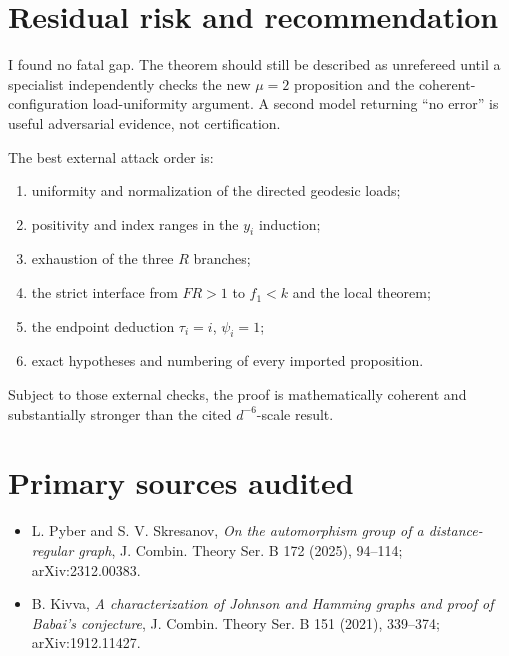 \documentclass[11pt]{article}
\begin{document}
\section{Residual risk and recommendation}
I found no fatal gap.  The theorem should still be described as unrefereed until a specialist independently checks the new $\mu=2$ proposition and the coherent-configuration load-uniformity argument.  A second model returning ``no error'' is useful adversarial evidence, not certification.

The best external attack order is:
\begin{enumerate}[leftmargin=2em,itemsep=0.25em]
\item uniformity and normalization of the directed geodesic loads;
\item positivity and index ranges in the $y_i$ induction;
\item exhaustion of the three $R$ branches;
\item the strict interface from $FR>1$ to $f_1<k$ and the local theorem;
\item the endpoint deduction $\tau_i=i$, $\psi_i=1$;
\item exact hypotheses and numbering of every imported proposition.
\end{enumerate}
Subject to those external checks, the proof is mathematically coherent and substantially stronger than the cited $d^{-6}$-scale result.

\section*{Primary sources audited}
\begin{itemize}[leftmargin=2em]
\item L. Pyber and S. V. Skresanov, \emph{On the automorphism group of a distance-regular graph}, J. Combin. Theory Ser. B 172 (2025), 94--114; arXiv:2312.00383.
\item B. Kivva, \emph{A characterization of Johnson and Hamming graphs and proof of Babai's conjecture}, J. Combin. Theory Ser. B 151 (2021), 339--374; arXiv:1912.11427.
\end{itemize}
\end{document}
